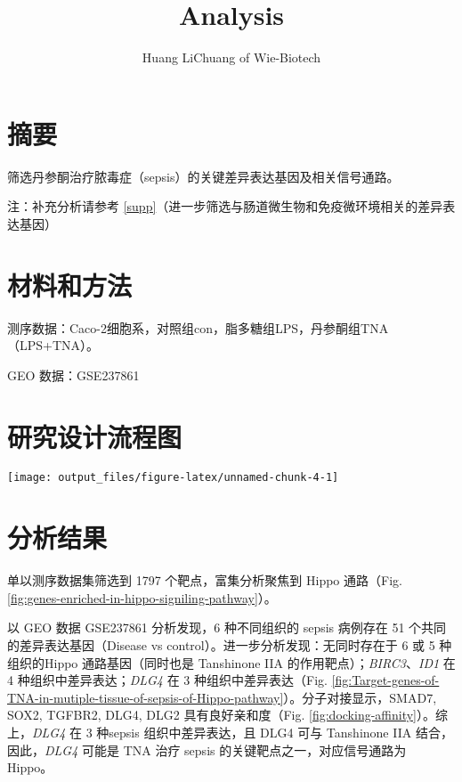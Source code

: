 \documentclass[
]{article}
\title{Analysis}
\author{Huang LiChuang of Wie-Biotech}
\date{}
\begin{document}
\maketitle

{
\setcounter{tocdepth}{4}
\tableofcontents
}
\listoffigures

\listoftables

\hypertarget{abstract}{%
\section{摘要}\label{abstract}}

筛选丹参酮治疗脓毒症（sepsis）的关键差异表达基因及相关信号通路。

注：补充分析请参考 \ref{supp}（进一步筛选与肠道微生物和免疫微环境相关的差异表达基因）

\hypertarget{methods}{%
\section{材料和方法}\label{methods}}

测序数据：Caco-2细胞系，对照组con，脂多糖组LPS，丹参酮组TNA（LPS+TNA）。

GEO 数据：GSE237861

\hypertarget{route}{%
\section{研究设计流程图}\label{route}}

\texttt{[image: output\_files/figure-latex/unnamed-chunk-4-1]}

\hypertarget{results}{%
\section{分析结果}\label{results}}

单以测序数据集筛选到 1797 个靶点，富集分析聚焦到 Hippo 通路（Fig. \ref{fig:genes-enriched-in-hippo-signiling-pathway}）。

以 GEO 数据 GSE237861 分析发现，6 种不同组织的 sepsis 病例存在 51 个共同的差异表达基因（Disease vs control）。进一步分析发现：无同时存在于 6 或 5 种组织的Hippo 通路基因（同时也是 Tanshinone IIA 的作用靶点）；\emph{BIRC3}、\emph{ID1} 在 4 种组织中差异表达；\emph{DLG4} 在 3 种组织中差异表达（Fig. \ref{fig:Target-genes-of-TNA-in-mutiple-tissue-of-sepsis-of-Hippo-pathway}）。分子对接显示，SMAD7, SOX2, TGFBR2, DLG4, DLG2 具有良好亲和度（Fig. \ref{fig:docking-affinity}）。综上，\emph{DLG4} 在 3 种sepsis 组织中差异表达，且 DLG4 可与 Tanshinone IIA 结合，因此，\emph{DLG4} 可能是 TNA 治疗 sepsis 的关键靶点之一，对应信号通路为 Hippo。
\end{document}
